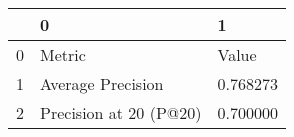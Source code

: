 \begin{tabular}{lll}
\toprule
 & 0 & 1 \\
\midrule
0 & Metric & Value \\
1 & Average Precision & 0.768273 \\
2 & Precision at 20 (P@20) & 0.700000 \\
\bottomrule
\end{tabular}
